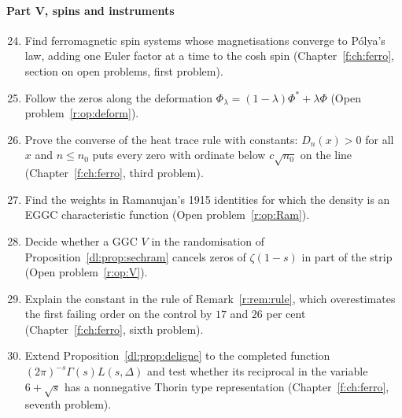 \paragraph{Part V, spins and instruments}
\begin{enumerate}
\setcounter{enumi}{23}
\item Find ferromagnetic spin systems whose magnetisations converge to P\'olya's law, adding one Euler factor at a time to the cosh spin (Chapter~\ref{f:ch:ferro}, section on open problems, first problem).
\item Follow the zeros along the deformation $\Phi_\lambda=(1-\lambda)\Phi^*+\lambda\Phi$ (Open problem~\ref{r:op:deform}).
\item Prove the converse of the heat trace rule with constants: $D_n(x)>0$ for all $x$ and $n\le n_0$ puts every zero with ordinate below $c\sqrt{n_0}$ on the line (Chapter~\ref{f:ch:ferro}, third problem).
\item Find the weights in Ramanujan's 1915 identities for which the density is an EGGC characteristic function (Open problem~\ref{r:op:Ram}).
\item Decide whether a GGC $V$ in the randomisation of Proposition~\ref{dl:prop:sechram} cancels zeros of $\zeta(1-s)$ in part of the strip (Open problem~\ref{r:op:V}).
\item Explain the constant in the rule of Remark~\ref{r:rem:rule}, which overestimates the first failing order on the control by $17$ and $26$ per cent (Chapter~\ref{f:ch:ferro}, sixth problem).
\item Extend Proposition~\ref{dl:prop:deligne} to the completed function $(2\pi)^{-s}\Gamma(s)L(s,\Delta)$ and test whether its reciprocal in the variable $6+\sqrt s$ has a nonnegative Thorin type representation (Chapter~\ref{f:ch:ferro}, seventh problem).
\end{enumerate}

